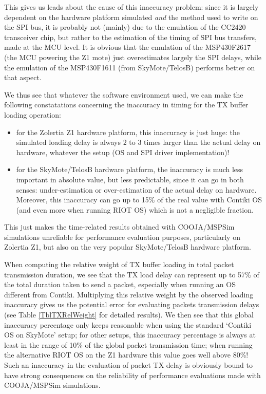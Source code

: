 \documentclass[10pt,final,journal,twocolumn]{IEEEtran}
\begin{document}
This gives us leads about the cause of this inaccuracy problem: since it
is largely dependent on the hardware platform simulated \emph{and} the method
used to write on the SPI bus, it is probably not (mainly) due to the
emulation of the CC2420 transceiver chip, but rather to the estimation of
the timing of SPI bus transfers, made at the MCU level. It is obvious that
the emulation of the MSP430F2617 (the MCU powering the Z1 mote) just
overestimates largely the SPI delays, while the emulation of the MSP430F1611
(from SkyMote/TelosB) performs better on that aspect.

\medskip

We thus see that whatever the software environment used, we can make the
following constatations concerning the inaccuracy in timing for the TX buffer
loading operation:
\begin{itemize}
\item for the Zolertia Z1 hardware platform, this inaccuracy is just huge:
the simulated loading delay is always 2 to 3 times larger than the actual
delay on hardware, whatever the setup (OS and SPI driver implementation)!
\item for the SkyMote/TelosB hardware platform, the inaccuracy is much less
important in absolute value, but less predictable, since it can go in both
senses: under-estimation or over-estimation of the actual delay on hardware.
Moreover, this inaccuracy can go up to 15\% of the real value with Contiki
OS (and even more when running RIOT OS) which is not a negligible fraction.
\end{itemize}
This just makes the time-related results obtained with COOJA/MSPSim
simulations unreliable for performance evaluation purposes, particularly
on Zolertia Z1, but also on the very popular SkyMote/TelosB hardware platform.

\medskip

When computing the relative weight of TX buffer loading in total packet
transmission duration, we see that the TX load delay can represent up to 57\%
of the total duration taken to send a packet, especially when running an OS
different from Contiki. Multiplying this relative weight by the observed
loading inaccuracy gives us the potential error for evaluating packets
transmission delays (see Table \ref{TblTXRelWeight} for detailed results).
We then see that this global inaccuracy percentage only keeps reasonable
when using the standard `Contiki OS on SkyMote' setup; for other setups,
this inaccuracy percentage is always at least in the range of 10\% of the
global packet transmission time; when running the alternative RIOT OS
on the Z1 hardware this value goes well above 80\%!
Such an inaccuracy in the evaluation of packet TX delay is obviously bound
to have strong consequences on the reliability of performance evaluations
made with COOJA/MSPSim simulations.
\end{document}
